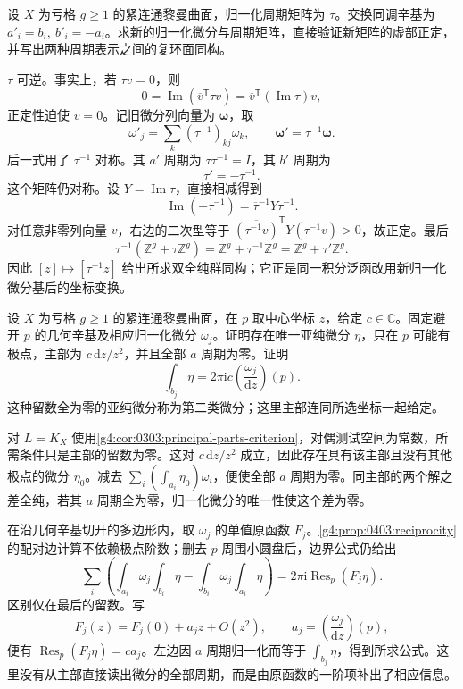 \BookExercises

\begin{exercise}
	\label{g4:ex:0401:exchange-cycles}
	设 \(X\) 为亏格 \(g\ge1\) 的紧连通黎曼曲面，归一化周期矩阵为 \(\tau\)。交换同调辛基为 \(a'_i=b_i,\ b'_i=-a_i\)。求新的归一化微分与周期矩阵，直接验证新矩阵的虚部正定，并写出两种周期表示之间的复环面同构。
\end{exercise}
\begin{solution}
	\(\tau\) 可逆。事实上，若 \(\tau v=0\)，则
	\[
		0=\operatorname{Im}(\overline v^{\mathsf T}\tau v)
		=\overline v^{\mathsf T}(\operatorname{Im}\tau)v,
	\]
	正定性迫使 \(v=0\)。记旧微分列向量为 \(\boldsymbol\omega\)，取
	\[
		\omega'_j=\sum_k(\tau^{-1})_{kj}\omega_k,\qquad
		\boldsymbol\omega'=\tau^{-1}\boldsymbol\omega.
	\]
	后一式用了 \(\tau^{-1}\) 对称。其 \(a'\) 周期为 \(\tau\tau^{-1}=I\)，其 \(b'\) 周期为
	\[
		\tau'=-\tau^{-1}.
	\]
	这个矩阵仍对称。设 \(Y=\operatorname{Im}\tau\)，直接相减得到
	\[
		\operatorname{Im}(-\tau^{-1})
		=\overline\tau^{-1}Y\tau^{-1}.
	\]
	对任意非零列向量 \(v\)，右边的二次型等于 \(\overline{(\tau^{-1}v)}^{\mathsf T}Y(\tau^{-1}v)>0\)，故正定。最后
	\[
		\tau^{-1}(\mathbb Z^g+\tau\mathbb Z^g)
		=\mathbb Z^g+\tau^{-1}\mathbb Z^g
		=\mathbb Z^g+\tau'\mathbb Z^g.
	\]
	因此 \([z]\mapsto[\tau^{-1}z]\) 给出所求双全纯群同构；它正是同一积分泛函改用新归一化微分基后的坐标变换。
\end{solution}

\begin{exercise}
	\label{g4:ex:0403:second-kind}
	设 \(X\) 为亏格 \(g\ge1\) 的紧连通黎曼曲面，在 \(p\) 取中心坐标 \(z\)，给定 \(c\in\mathbb C\)。固定避开 \(p\) 的几何辛基及相应归一化微分 \(\omega_j\)。证明存在唯一亚纯微分 \(\eta\)，只在 \(p\) 可能有极点，主部为 \(c\,\mathrm{d}z/z^2\)，并且全部 \(a\) 周期为零。证明
	\[
		\int_{b_j}\eta
		=2\pi\mathrm{i}c\left(\frac{\omega_j}{\mathrm{d}z}\right)(p).
	\]
	这种留数全为零的亚纯微分称为第二类微分；这里主部连同所选坐标一起给定。
\end{exercise}
\begin{solution}
	对 \(L=K_X\) 使用\cref{g4:cor:0303:principal-parts-criterion}，对偶测试空间为常数，所需条件只是主部的留数为零。这对 \(c\,\mathrm{d}z/z^2\) 成立，因此存在具有该主部且没有其他极点的微分 \(\eta_0\)。减去 \(\sum_i(\int_{a_i}\eta_0)\omega_i\)，便使全部 \(a\) 周期为零。同主部的两个解之差全纯，若其 \(a\) 周期全为零，归一化微分的唯一性使这个差为零。

	在沿几何辛基切开的多边形内，取 \(\omega_j\) 的单值原函数 \(F_j\)。\cref{g4:prop:0403:reciprocity}的配对边计算不依赖极点阶数；删去 \(p\) 周围小圆盘后，边界公式仍给出
	\[
		\sum_i\left(\int_{a_i}\omega_j\int_{b_i}\eta
		-\int_{b_i}\omega_j\int_{a_i}\eta\right)
		=2\pi\mathrm{i}\operatorname{Res}_p(F_j\eta).
	\]
	区别仅在最后的留数。写
	\[
		F_j(z)=F_j(0)+a_jz+O(z^2),\qquad
		a_j=\left(\frac{\omega_j}{\mathrm{d}z}\right)(p),
	\]
	便有 \(\operatorname{Res}_p(F_j\eta)=ca_j\)。左边因 \(a\) 周期归一化而等于 \(\int_{b_j}\eta\)，得到所求公式。这里没有从主部直接读出微分的全部周期，而是由原函数的一阶项补出了相应信息。
\end{solution}

